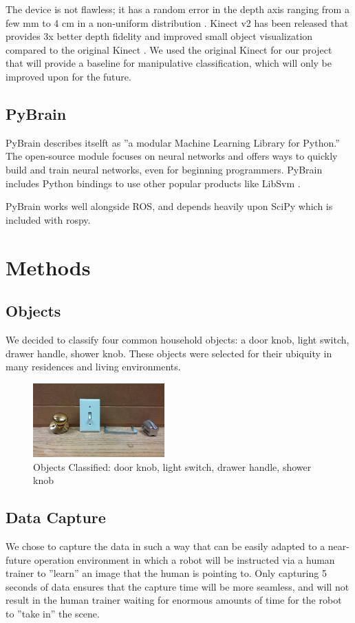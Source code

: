\documentclass{article}
\begin{document}
The device is not flawless; it has a random error in the depth axis 
ranging from a few mm to 4 cm in a non-uniform distribution \cite{khoshelham2012accuracy,nguyen2012modeling}.
Kinect v2 has been released that provides 3x better depth fidelity and improved small object visualization compared to 
the original Kinect \cite{kinect}. We used the original Kinect for our project that will provide a baseline for manipulative classification, which will only be improved upon for the future.

\subsection{PyBrain}
PyBrain describes itselft as ''a modular Machine Learning Library for Python.'' The open-source module focuses on neural networks and offers ways to quickly build and train neural networks, even for beginning programmers. PyBrain includes Python bindings to use other popular products like LibSvm \cite{pybrain, pybrainCode}.  

PyBrain works well alongside ROS, and depends heavily upon SciPy which is included with rospy.

\section{Methods}
\subsection{Objects}
We decided to classify four common household objects: a door knob, light switch, drawer handle, shower knob. These objects were selected
for their ubiquity in many residences and living environments. 

\begin{figure}[h!]
    \centering
    \includegraphics[width=0.45\textwidth]{All_Knobs.jpg}
    \caption{Objects Classified: door knob, light switch, drawer handle, shower knob}
    \label{fig:objects}
\end{figure}

\subsection{Data Capture}
We chose to capture the data in such a way that can be easily adapted to a near-future operation environment in which a robot will be instructed via a human trainer to ''learn'' an image that the human is pointing to.  Only capturing 5 seconds of data ensures that the capture time will be more seamless, and will not result in the human trainer waiting for enormous amounts of time for the robot to ''take in'' the scene.  
\end{document}
